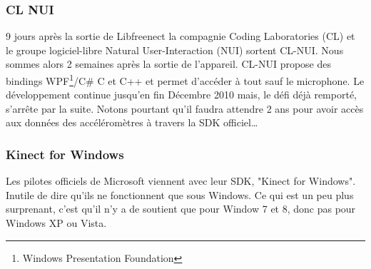 \subsubsection{CL NUI}
9 jours après la sortie de Libfreenect la compagnie Coding Laboratories 
(CL) et le groupe logiciel-libre
Natural User-Interaction (NUI) sortent CL-NUI\cite{clnui}. Nous sommes alors 2 semaines 
après la sortie de l'appareil. CL-NUI propose des bindings 
WPF\footnote{Windows Presentation Foundation}/C\# C et C++ et permet d'accéder 
à tout sauf le microphone. Le développement continue jusqu'en fin Décembre 2010 
mais,
le défi déjà remporté, s'arrête par la suite. Notons pourtant qu'il faudra 
attendre 2 ans pour avoir accès aux données des accéléromètres à travers la 
SDK officiel\ldots
\subsubsection{Kinect for Windows}  
Les pilotes officiels de Microsoft viennent avec leur SDK, "Kinect for 
Windows". Inutile de dire
qu'ils ne fonctionnent que sous Windows. Ce qui est un peu plus surprenant, 
c'est qu'il n'y a de soutient que pour Window 7 et 8, donc pas pour Windows XP 
ou Vista.
